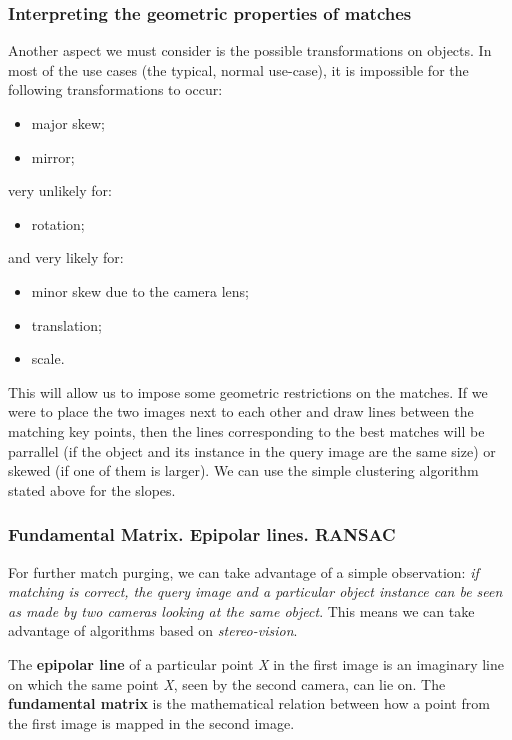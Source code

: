 \documentclass[a4paper,onecolumn,oneside,titlepage,11pt]{report}
\begin{document}
\subsubsection{Interpreting the geometric properties of matches}

Another aspect we must consider is the possible transformations on objects.
In most of the use cases (the typical, normal use-case), it is impossible for the following transformations to occur:
\begin{itemize}
	\item major skew;
	\item mirror;
\end{itemize}
very unlikely for:
\begin{itemize}
	\item rotation;
\end{itemize}
and very likely for:
\begin{itemize}
	\item minor skew due to the camera lens;
	\item translation;
	\item scale.
\end{itemize}

This will allow us to impose some geometric restrictions on the matches. If we were to place the two images next to each other and draw lines between the matching key points, then the lines corresponding to the best matches will be parrallel (if the object and its instance in the query image are the same size) or skewed (if one of them is larger).
We can use the simple clustering algorithm stated above for the slopes.

\subsubsection{Fundamental Matrix. Epipolar lines. RANSAC}
For further match purging, we can take advantage of a simple observation: \emph{if matching is correct, the query image and a particular object instance can be seen as made by two cameras \emph{looking} at the same object}. This means we can take advantage of algorithms based on \emph{stereo-vision}.

The \textbf{epipolar line} of a particular point \emph{X} in the first image is an imaginary line on which the same point \emph{X}, seen by the second camera, can lie on.
The \textbf{fundamental matrix} is the mathematical relation between how a point from the first image is mapped in the second image.
\end{document}

